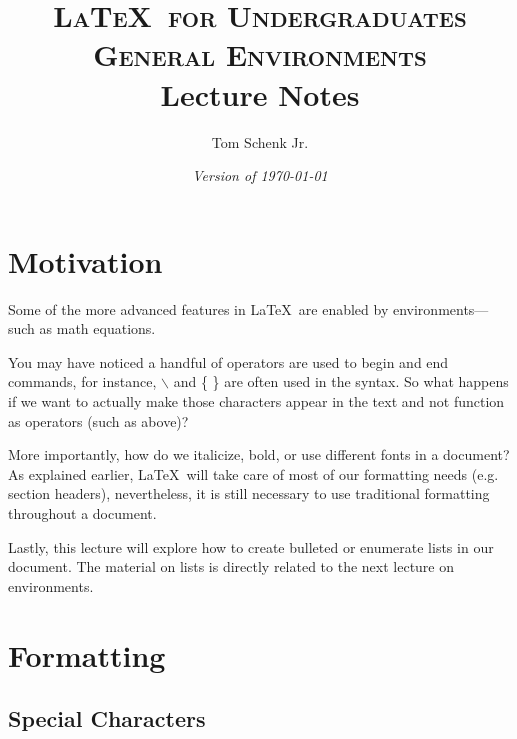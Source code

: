 \documentclass{article}
\title{\textsc{\LaTeX\ for Undergraduates\\
			General Environments} \\
			Lecture Notes}
\author{Tom Schenk Jr.}
\date{\textit{Version of \today}}
\begin{document}
\maketitle

\section{Motivation}

Some of the more advanced features in \LaTeX\ are enabled by environments---such as math equations. 

You may have noticed a handful of operators are used to begin and end commands, for instance, \texttt{$\backslash$} and \{ \} are often used in the syntax. So what happens if we want to actually make those characters appear in the text and not function as operators (such as above)?

More importantly, how do we italicize, bold, or use different fonts in a document? As explained earlier, \LaTeX\ will take care of most of our formatting needs (e.g. section headers), nevertheless, it is still necessary to use traditional formatting throughout a document.

Lastly, this lecture will explore how to create bulleted or enumerate lists in our document. The material on lists is directly related to the next lecture on environments.

\section{Formatting}

\subsection{Special Characters}
\end{document}
